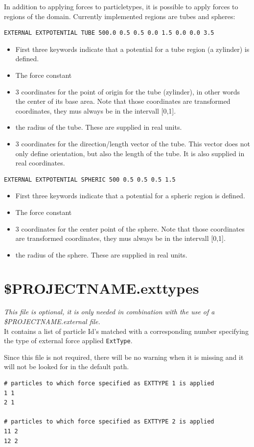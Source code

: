 In addition to applying forces to particletypes, it is possible to apply forces to regions of the domain.
Currently implemented regions are tubes and spheres:
\begin{lstlisting}
EXTERNAL EXTPOTENTIAL TUBE 500.0 0.5 0.5 0.0 1.5 0.0 0.0 3.5
\end{lstlisting}
\begin{itemize}
\item First three keywords indicate that a potential for a tube region (a zylinder) is defined.
\item The force constant 
\item 3 coordinates for the point of origin for the tube (zylinder), in other words the center of its base area. Note that those coordinates are transformed coordinates, they mus always be in the intervall [0,1].
\item the radius of the tube. These are supplied in real units.
\item 3 coordinates for the direction/length vector of the tube. This vector does not only define orientation, but also the length of the tube. It is also supplied in real coordinates.
\end{itemize}
\begin{lstlisting}
EXTERNAL EXTPOTENTIAL SPHERIC 500 0.5 0.5 0.5 1.5
\end{lstlisting}
\begin{itemize}
\item First three keywords indicate that a potential for a spheric region is defined.
\item The force constant 
\item 3 coordinates for the center point of the sphere. Note that those coordinates are transformed coordinates, they mus always be in the intervall [0,1].
\item the radius of the sphere. These are supplied in real units.
\end{itemize}

\section{\$PROJECTNAME.exttypes}
\emph{This file is optional, it is only needed in combination with the use of a \$PROJECTNAME.external file.}\\
\bigbreak
It contains a list of particle Id's matched with a corresponding number specifying the type of external force applied {\tt ExtType}.

Since this file is not required, there will be no warning when it is missing and it will not be looked for in the default path.
\begin{lstlisting}
# particles to which force specified as EXTTYPE 1 is applied
1 1
2 1

# particles to which force specified as EXTTYPE 2 is applied
11 2
12 2
\end{lstlisting}
